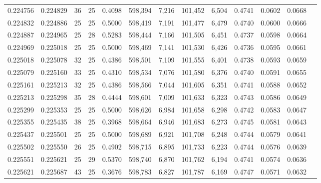 \begin{tabular}{rrrrrrrrrrrrr}
0.224756 & 0.224829 &  36 &  25 &                                     0.4098 & 598,394 &   7,216 & 101,452 &   6,504 & 0.4741 & 0.0602 & 0.0668 \\
0.224832 & 0.224886 &  25 &  25 &                                     0.5000 & 598,419 &   7,191 & 101,477 &   6,479 & 0.4740 & 0.0600 & 0.0666 \\
0.224887 & 0.224965 &  25 &  28 &                                     0.5283 & 598,444 &   7,166 & 101,505 &   6,451 & 0.4737 & 0.0598 & 0.0664 \\
0.224969 & 0.225018 &  25 &  25 &                                     0.5000 & 598,469 &   7,141 & 101,530 &   6,426 & 0.4736 & 0.0595 & 0.0661 \\
0.225018 & 0.225078 &  32 &  25 &                                     0.4386 & 598,501 &   7,109 & 101,555 &   6,401 & 0.4738 & 0.0593 & 0.0659 \\
0.225079 & 0.225160 &  33 &  25 &                                     0.4310 & 598,534 &   7,076 & 101,580 &   6,376 & 0.4740 & 0.0591 & 0.0655 \\
0.225161 & 0.225213 &  32 &  25 &                                     0.4386 & 598,566 &   7,044 & 101,605 &   6,351 & 0.4741 & 0.0588 & 0.0652 \\
0.225213 & 0.225298 &  35 &  28 &                                     0.4444 & 598,601 &   7,009 & 101,633 &   6,323 & 0.4743 & 0.0586 & 0.0649 \\
0.225299 & 0.225353 &  25 &  25 &                                     0.5000 & 598,626 &   6,984 & 101,658 &   6,298 & 0.4742 & 0.0583 & 0.0647 \\
0.225355 & 0.225435 &  38 &  25 &                                     0.3968 & 598,664 &   6,946 & 101,683 &   6,273 & 0.4745 & 0.0581 & 0.0643 \\
0.225437 & 0.225501 &  25 &  25 &                                     0.5000 & 598,689 &   6,921 & 101,708 &   6,248 & 0.4744 & 0.0579 & 0.0641 \\
0.225502 & 0.225550 &  26 &  25 &                                     0.4902 & 598,715 &   6,895 & 101,733 &   6,223 & 0.4744 & 0.0576 & 0.0639 \\
0.225551 & 0.225621 &  25 &  29 &                                     0.5370 & 598,740 &   6,870 & 101,762 &   6,194 & 0.4741 & 0.0574 & 0.0636 \\
0.225621 & 0.225687 &  43 &  25 &                                     0.3676 & 598,783 &   6,827 & 101,787 &   6,169 & 0.4747 & 0.0571 & 0.0632 \\

\end{tabular}
